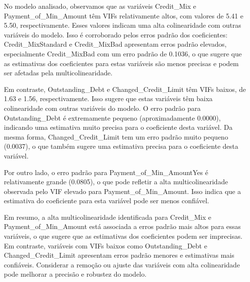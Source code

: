 \documentclass[
  letterpaper,
  DIV=11,
  numbers=noendperiod]{scrreprt}
\begin{document}
No modelo analisado, observamos que as variáveis Credit\_Mix e
Payment\_of\_Min\_Amount têm VIFs relativamente altos, com valores de
5.41 e 5.50, respectivamente. Esses valores indicam uma alta
colinearidade com outras variáveis do modelo. Isso é corroborado pelos
erros padrão dos coeficientes: Credit\_MixStandard e Credit\_MixBad
apresentam erros padrão elevados, especialmente Credit\_MixBad com um
erro padrão de 0.1036, o que sugere que as estimativas dos coeficientes
para estas variáveis são menos precisas e podem ser afetadas pela
multicolinearidade.

Em contraste, Outstanding\_Debt e Changed\_Credit\_Limit têm VIFs
baixos, de 1.63 e 1.56, respectivamente. Isso sugere que estas variáveis
têm baixa colinearidade com outras variáveis do modelo. O erro padrão
para Outstanding\_Debt é extremamente pequeno (aproximadamente 0.0000),
indicando uma estimativa muito precisa para o coeficiente desta
variável. Da mesma forma, Changed\_Credit\_Limit tem um erro padrão
muito pequeno (0.0037), o que também sugere uma estimativa precisa para
o coeficiente desta variável.

Por outro lado, o erro padrão para Payment\_of\_Min\_AmountYes é
relativamente grande (0.0805), o que pode refletir a alta
multicolinearidade observada pelo VIF elevado para
Payment\_of\_Min\_Amount. Isso indica que a estimativa do coeficiente
para esta variável pode ser menos confiável.

Em resumo, a alta multicolinearidade identificada para Credit\_Mix e
Payment\_of\_Min\_Amount está associada a erros padrão mais altos para
essas variáveis, o que sugere que as estimativas dos coeficientes podem
ser imprecisas. Em contraste, variáveis com VIFs baixos como
Outstanding\_Debt e Changed\_Credit\_Limit apresentam erros padrão
menores e estimativas mais confiáveis. Considerar a remoção ou ajuste
das variáveis com alta colinearidade pode melhorar a precisão e robustez
do modelo.
\end{document}
